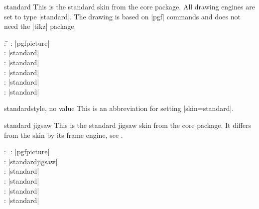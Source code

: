 \begin{docSkin}{standard}
  This is the standard skin from the core package. All drawing engines
  are set to type |standard|. The drawing is based on |pgf| commands and
  does not need the |tikz| package.
\begin{tcolorbox}[skintable=standard]
  \begin{tabbing}
    : \=\kill
    :  \> |pgfpicture|\\ 
    :           \> |standard|\\
    : \> |standard|\\ 
    :        \> |standard|\\
    :    \> |standard|\\
    :           \> |standard|
  \end{tabbing}
\end{tcolorbox}
\end{docSkin}

\begin{docTcbKey}{standard}{}{style, no value}
  This is an abbreviation for setting |skin=standard|.
\end{docTcbKey}

\begin{dispExample}
\end{dispExample}

\clearpage

\begin{docSkin}{standard jigsaw}
  This is the standard jigsaw skin from the core package. It differs from
  the skin  by its frame engine, see .
\begin{tcolorbox}[skintable=standard jigsaw]
  \begin{tabbing}
    : \=\kill
    :  \> |pgfpicture|\\ 
    :           \> |standardjigsaw|\\
    : \> |standard|\\ 
    :        \> |standard|\\
    :    \> |standard|\\
    :           \> |standard|
  \end{tabbing}
\end{tcolorbox}
\end{docSkin}


